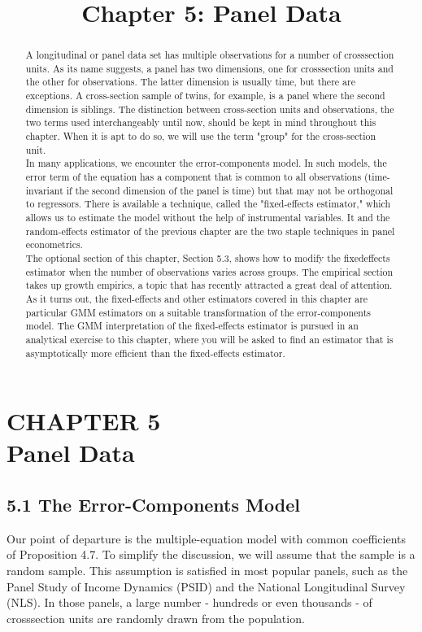 \documentclass[10pt]{article}
\title{Chapter 5: Panel Data}
\author{}
\date{}
\begin{document}
\maketitle

\section*{CHAPTER 5 \\
 Panel Data}
\begin{abstract}
A longitudinal or panel data set has multiple observations for a number of crosssection units. As its name suggests, a panel has two dimensions, one for crosssection units and the other for observations. The latter dimension is usually time, but there are exceptions. A cross-section sample of twins, for example, is a panel where the second dimension is siblings. The distinction between cross-section units and observations, the two terms used interchangeably until now, should be kept in mind throughout this chapter. When it is apt to do so, we will use the term "group" for the cross-section unit.\\
In many applications, we encounter the error-components model. In such models, the error term of the equation has a component that is common to all observations (time-invariant if the second dimension of the panel is time) but that may not be orthogonal to regressors. There is available a technique, called the "fixed-effects estimator," which allows us to estimate the model without the help of instrumental variables. It and the random-effects estimator of the previous chapter are the two staple techniques in panel econometrics.\\
The optional section of this chapter, Section 5.3, shows how to modify the fixedeffects estimator when the number of observations varies across groups. The empirical section takes up growth empirics, a topic that has recently attracted a great deal of attention.\\
As it turns out, the fixed-effects and other estimators covered in this chapter are particular GMM estimators on a suitable transformation of the error-components model. The GMM interpretation of the fixed-effects estimator is pursued in an analytical exercise to this chapter, where you will be asked to find an estimator that is asymptotically more efficient than the fixed-effects estimator.
\end{abstract}

\subsection*{5.1 The Error-Components Model}
Our point of departure is the multiple-equation model with common coefficients of Proposition 4.7. To simplify the discussion, we will assume that the sample is a random sample. This assumption is satisfied in most popular panels, such as the Panel Study of Income Dynamics (PSID) and the National Longitudinal Survey (NLS). In those panels, a large number - hundreds or even thousands - of crosssection units are randomly drawn from the population.
\end{document}
